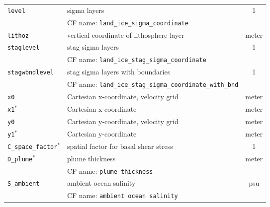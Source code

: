 
\begin{center}
  \tablelasttail{\hline}
  \begin{supertabular}{|l|p{8cm}|c|}
    \hline
\texttt{level} & sigma layers & 1\\
&CF name: \texttt{land\_ice\_sigma\_coordinate}&\\
\hline
\texttt{lithoz} & vertical coordinate of lithosphere layer & meter\\
\hline
\texttt{staglevel} & stag sigma layers & 1\\
&CF name: \texttt{land\_ice\_stag\_sigma\_coordinate}&\\
\hline
\texttt{stagwbndlevel} & stag sigma layers with boundaries & 1\\
&CF name: \texttt{land\_ice\_stag\_sigma\_coordinate\_with\_bnd}&\\
\hline
\texttt{x0} & Cartesian x-coordinate, velocity grid & meter\\
\hline
\texttt{x1}$^\ast$ & Cartesian x-coordinate & meter\\
\hline
\texttt{y0} & Cartesian y-coordinate, velocity grid & meter\\
\hline
\texttt{y1}$^\ast$ & Cartesian y-coordinate & meter\\
\hline
\texttt{C\_space\_factor}$^\ast$ & spatial factor for basal shear stress & 1\\
\hline
\texttt{D\_plume}$^\ast$ & plume thickness & meter\\
&CF name: \texttt{plume\_thickness}&\\
\hline
\texttt{S\_ambient} & ambient ocean salinity & psu\\
&CF name: \texttt{ambient ocean salinity}&\\

\end{supertabular}
\end{center}

